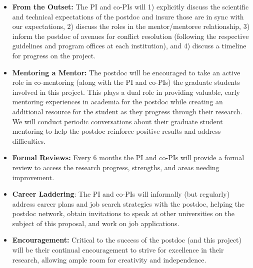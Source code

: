 \documentclass[11pt]{article}
\begin{document}
\begin{itemize}
\item \textbf{From the Outset:} The PI and co-PIs will 1) explicitly discuss
the scientific and technical expectations of the postdoc and insure
those are in sync with our expectations, 2) discuss the roles in the
mentor/mentoree relationship, 3) inform the postdoc of avenues for
conflict resolution (following the respective guidelines
and program offices at each institution), and 4) discuss a timeline for progress on the
project.
\item \textbf{Mentoring a Mentor:} The postdoc will be encouraged to take
an active role in co-mentoring (along with the PI and co-PIs) the
graduate students involved in this project. This plays a dual role
in providing valuable, early mentoring experiences in academia for
the postdoc while creating an additional resource for the student
as they progress through their research. We will conduct periodic
conversations about their graduate student mentoring to help the postdoc
reinforce positive results and address difficulties.
\item \textbf{Formal Reviews: }Every 6 months the PI and co-PIs will provide
a formal review to access the research progress, strengths, and areas
needing improvement. 
\item \textbf{Career Laddering}: The PI and co-PIs will informally (but
regularly) address career plans and job search strategies with the
postdoc, helping the postdoc network, obtain invitations to speak
at other universities on the subject of this proposal, and work on
job applications. 
\item \textbf{Encouragement: }Critical to the success of the postdoc (and
this project) will be their continual encouragement to strive for
excellence in their research, allowing ample room for creativity and
independence.\end{itemize}
\end{document}
